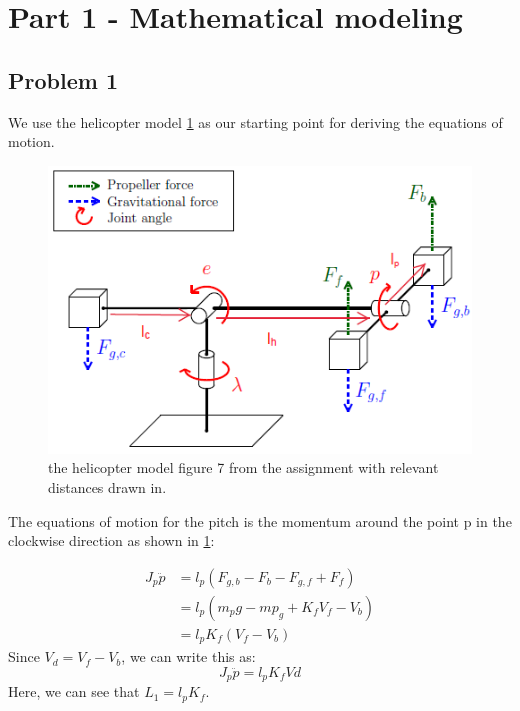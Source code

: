 
\def\SPSB#1#2{\rlap{\textsuperscript{{#1}}}\SB{#2}}
\def\SP#1{\textsuperscript{{#1}}}
\def\SB#1{\textsubscript{{#1}}}


\section{Part 1 - Mathematical modeling}
\subsection{Problem 1}

We use the helicopter model \cref{fig:helicopter_model} as our
starting point for deriving the equations of motion.

\begin{figure}[hbp]
  \caption{the helicopter model figure 7 from the assignment
    \cite[p.12]{assignment} with relevant distances drawn in.}

  \label{fig:helicopter_model}
  \includegraphics[width=\textwidth]{images/helicopter_model}
\end{figure}

The equations of motion for the pitch is the momentum around the point
p in the clockwise direction as shown in \cref{fig:helicopter_model}:

\begin{align*}
  J_p\ddot{p} &= l_p(F_{g,b} - F_b - F_{g,f} + F_f) \\
              &= l_p(m_pg - mp_g + K_fV_f - V_b) \\
              &= l_pK_f(V_f-V_b)
\end{align*}
Since $V_d = V_f-V_b$, we can write this as:
\begin{equation}
  J_p\ddot{p} = l_pK_fVd
\end{equation}
Here, we can see that $L_1 = l_pK_f$.

